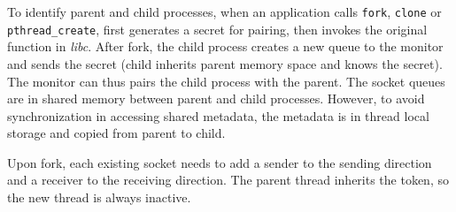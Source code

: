 
To identify parent and child processes, when an application calls \texttt{fork}, \texttt{clone} or \texttt{pthread\_create}, \libipc{} first generates a secret for pairing, then invokes the original function in \emph{libc}.
After fork, the child process creates a new queue to the monitor and sends the secret (child inherits parent memory space and knows the secret).
The monitor can thus pairs the child process with the parent. 
The socket queues are in shared memory between parent and child processes.
However, to avoid synchronization in accessing shared metadata, the metadata is in thread local storage and copied from parent to child.

Upon fork, each existing socket needs to add a sender to the sending direction and a receiver to the receiving direction.
The parent thread inherits the token, so the new thread is always inactive.



